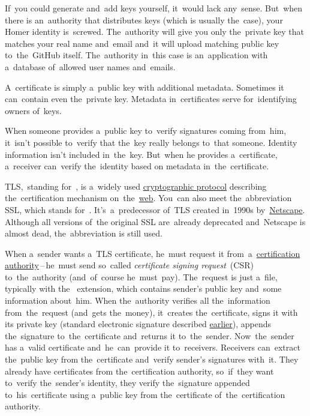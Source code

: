 If~you could generate and~add keys yourself, it~would lack any~sense.
But~when there is an~authority that distributes keys (which is usually the~case), your Homer identity is~screwed.
The~authority will give you only the~private key that matches your real name and~email and~it will upload matching public key to~the~GitHub itself.
The~authority in~this case is an~application with a~database of~allowed user names and~emails.

\label{certificate}
A~certificate is simply a~public key with additional metadata.
Sometimes it can~contain even the~private key.
Metadata in~certificates serve for~identifying owners of~keys.

When someone provides a~public key to~verify signatures coming from~him, it~isn't possible to~verify that the~key really belongs to~that someone.
Identity information isn't included in~the~key.
But~when he provides a~certificate, a~receiver can~verify the~identity based on metadata in~the~certificate.

\label{tls}
TLS,~standing for~, is a~widely used \hyperref[protocolstandard]{cryptographic protocol} describing the~certification mechanism on~the~\hyperref[internetweb]{web}.
You~can also meet the~abbreviation SSL, which stands for~.
It's~a~predecessor of~TLS created in~1990s by~\href{https://en.wikipedia.org/wiki/Netscape}{Netscape}.
Although all versions of~the original SSL are~already deprecated and~Netscape is almost dead, the~abbreviation is still used.

When a~sender wants a~TLS certificate, he~must request it from~a~\hyperref[certificationauthority]{certification authority}\,--\,he~must send so~called \textit{certificate signing request}~(CSR) to~the~authority (and~of~course he~must~pay).
The~request is just a~file, typically with the~ extension, which contains sender's public key and~some information about~him.
When the~authority verifies all the~information from~the~request (and~gets the~money), it~creates the~certificate, signs it with its private key (standard electronic signature described \hyperref[electronicsignature]{earlier}), appends the~signature to~the~certificate and~returns it to~the~sender.
Now~the~sender has a~valid certificate and~he~can~provide it to~receivers.
Receivers can~extract the~public key from the~certificate and~verify sender's signatures with~it.
They already have certificates from the~certification authority, so~if~they want to~verify the~sender's identity, they verify the~signature appended to~his~certificate using a~public key from the~certificate of~the~certification authority.

